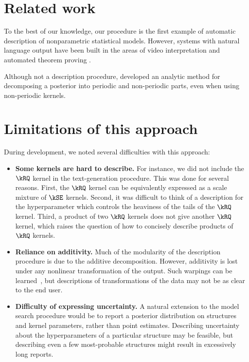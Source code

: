 \section{Related work}
\label{sec:description-related-work}
To the best of our knowledge, our procedure is the first example of automatic description of nonparametric statistical models.
However, systems with natural language output have been built in the areas of video interpretation \citep{barbu2012video} and automated theorem proving \citep{ganesalingam2013fully}.

Although not a description procedure, \citet{durrande2013gaussian} developed an analytic method for decomposing a \gp{} posterior into periodic and non-periodic parts, even when using non-periodic kernels.



\section{Limitations of this approach}

During development, we noted several difficulties with this approach:

\begin{itemize}

\item {\bf Some kernels are hard to describe.}
For instance, we did not include the $\kRQ$ kernel in the text-generation procedure.
This was done for several reasons.
First, the $\kRQ$ kernel can be equivalently expressed as a scale mixture of $\kSE$ kernels.
Second, it was difficult to think of a description for the hyperparameter which controls the heaviness of the tails of the $\kRQ$ kernel.
Third, a product of two $\kRQ$ kernels does not give another $\kRQ$ kernel, which raises the question of how to concisely describe products of $\kRQ$ kernels.

\item {\bf Reliance on additivity.}
Much of the modularity of the description procedure is due to the additive decomposition.
However, additivity is lost under any nonlinear transformation of the output.
Such warpings can be learned~\citep{snelson2004warped}, but descriptions of transformations of the data may not be as clear to the end user.

\item {\bf Difficulty of expressing uncertainty.}
A natural extension to the model search procedure would be to report a posterior distribution on structures and kernel parameters, rather than point estimates.
Describing uncertainty about the hyperparameters of a particular structure may be feasible,
but describing even a few most-probable structures might result in excessively long reports.

\end{itemize}


